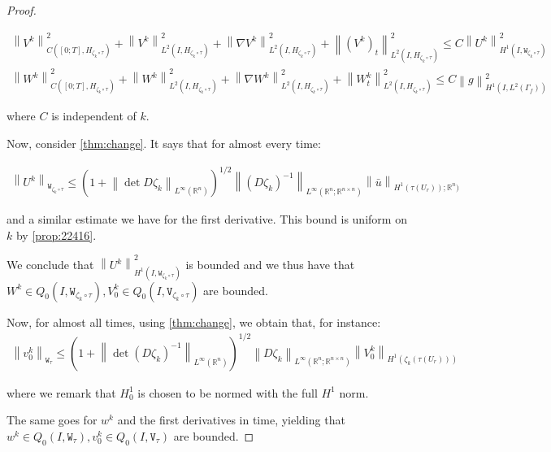 \documentclass[english,a4paper,10pt,oneside]{scrbook}	%
\theoremstyle{break}
\newenvironment{mproof}[1][\proofname]{%
  \begin{proof}[#1]$ $\par\nobreak\ignorespaces
}{%
  \end{proof}
}
\renewcommand*{\proofname}{Proof}
\theoremstyle{remark}
\newcommand{\mR}{\mathbb{R}}
\newcommand{\norm}[1]{\left\lVert#1\right\rVert}
\newcommand{\tw}[1]{\texttt{#1}}
\begin{document}
\begin{mproof}
\begin{align*}
\norm{V^k}^2_{C([0;T],H_{\zeta_k\circ \tau})}+\norm{V^k}_{L^2(I,H_{\zeta_k\circ \tau})}^2+ \norm{\nabla V^k}_{L^2(I,H_{\zeta_k\circ \tau})}^2 + \norm{(V^k)_t}^2_{L^2(I,H_{\zeta_k\circ \tau})}\leq C\norm{U^k}_{H^1(I,\tw{W}_{\zeta_k\circ \tau})}^2\\
\norm{W^k}^2_{C([0;T],H_{\zeta_k\circ \tau})}+\norm{W^k}_{L^2(I,H_{\zeta_k\circ \tau})}^2+ \norm{\nabla W^k}_{L^2(I,H_{\zeta_k\circ \tau})}^2 + \norm{W^k_t}^2_{L^2(I,H_{\zeta_k\circ \tau})}\leq C\norm{g}_{H^1(I,L^2(\Gamma_f))}^2
\end{align*}


where $C$ is independent of $k$.


Now, consider \cref{thm:change}. It says that for almost every time:

\begin{align*}
\norm{U^k}_{\tw{W}_{\zeta_k\circ \tau}}\leq \left ( 1+\norm{\det D\zeta_k}_{L^\infty(\mR^n)}\right)^{1/2} \norm{(D\zeta_k)^{-1}}_{L^\infty(\mR^n;\mR^{n\times n})}\norm{\bar{u}}_{H^1(\tau(U_r));\mR^n)}
\end{align*}

and a similar estimate we have for the first derivative. This bound is uniform on $k$ by \cref{prop:22416}.

We conclude that $\norm{U^k}_{H^1(I,\tw{W}_{\zeta_k\circ \tau})}^2$ is bounded and we thus have that $W^k \in Q_0(I, \tw{W}_{\zeta_k\circ \tau}), V_0^k \in Q_0(I,\tw{V}_{\zeta_k\circ \tau})$ are bounded.

Now, for almost all times, using \cref{thm:change}, we obtain that, for instance:
\begin{align*}
\norm{v_0^k}_{\tw{W}_{ \tau}}\leq \left ( 1+\norm{\det (D\zeta_k)^{-1}}_{L^\infty(\mR^n)}\right)^{1/2} \norm{D\zeta_k}_{L^\infty(\mR^n;\mR^{n\times n})}\norm{V_0^k}_{H^1(\zeta_k(\tau(U_r)))}
\end{align*}

where we remark that $H^1_0$ is chosen to be normed with the full $H^1$ norm.

The same goes for $w^k$ and the first derivatives in time, yielding that $w^k \in Q_0(I, \tw{W}_{ \tau}), v_0^k \in Q_0(I,\tw{V}_{\tau})$ are bounded.


\end{mproof}
\end{document}
